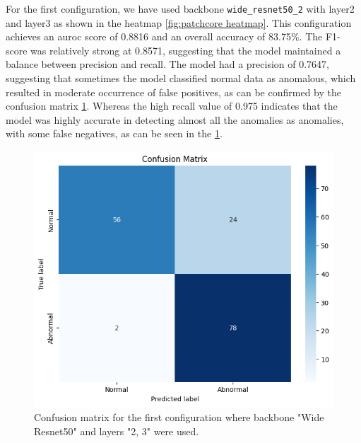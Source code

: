 For the first configuration, we have used backbone \texttt{wide\_resnet50\_2} with layer2 and layer3 as shown in the heatmap \ref{fig:patchcore heatmap}. This configuration achieves an \gls{auroc} score of 0.8816 and an overall accuracy of 83.75\%. The F1-score was relatively strong at 0.8571, suggesting that the model maintained a balance between precision and recall. The model had a precision of 0.7647, suggesting that sometimes the model classified normal data as anomalous, which resulted in moderate occurrence of false positives, as can be confirmed by the confusion matrix \ref{fig:patchcore config1 confusion matrix}. Whereas the high recall value of 0.975 indicates that the model was highly accurate in detecting almost all the anomalies as anomalies, with some false negatives, as can be seen in the \ref{fig:patchcore config1 confusion matrix}.

\begin{figure}[ht!]
    \centering
    \includegraphics[width=1\linewidth]{Rohit_Master_Thesis//Images/patchcore_config1_confusion_matrix.jpg}
    \caption{Confusion matrix for the first configuration where backbone "Wide Resnet50" and layers "2, 3" were used.}
    \label{fig:patchcore config1 confusion matrix}
\end{figure}

